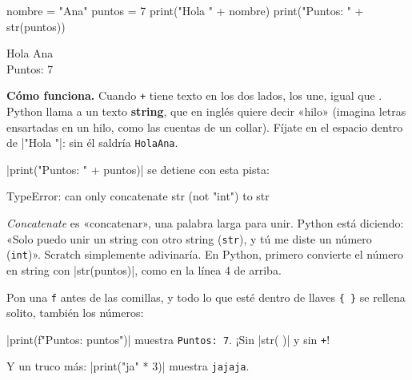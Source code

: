 \begin{tcbraster}[raster columns=1, raster valign=center, raster row skip=6pt]
\begin{tcolorbox}[colback=white, colframe=white, boxrule=0pt, valign=center]
\begin{scratch}
\end{scratch}
\end{tcolorbox}
\begin{tcolorbox}[colback=white, colframe=white, boxrule=0pt, left=0pt, right=0pt, top=0pt, bottom=0pt, valign=center]
\begin{code}
nombre = "Ana"
puntos = 7
print("Hola " + nombre)
print("Puntos: " + str(puntos))
\end{code}
\begin{outputbox}
Hola Ana\\
Puntos: 7
\end{outputbox}
\end{tcolorbox}
\end{tcbraster}

\textbf{Cómo funciona.} Cuando \texttt{+} tiene texto en los dos lados, los une, igual que . Python llama a un texto \textbf{string}, que en inglés quiere decir «hilo» (imagina letras ensartadas en un hilo, como las cuentas de un collar). Fíjate en el espacio dentro de \py|"Hola "|: sin él saldría \texttt{HolaAna}.

\begin{watchout}
\py|print("Puntos: " + puntos)| se detiene con esta pista:
\begin{errorbox}
TypeError: can only concatenate str (not "int") to str
\end{errorbox}
\emph{Concatenate} es «concatenar», una palabra larga para unir. Python está diciendo: «Solo puedo unir un string con otro string (\texttt{str}), y tú me diste un número (\texttt{int})». Scratch simplemente adivinaría. En Python, primero convierte el número en string con \py|str(puntos)|, como en la línea 4 de arriba.
\end{watchout}

\begin{think}
Pon una \texttt{f} antes de las comillas, y todo lo que esté dentro de llaves \texttt{\{ \}} se rellena solito, también los números:\par
\py|print(f"Puntos: {puntos}")| muestra \texttt{Puntos: 7}. ¡Sin \py|str( )| y sin \texttt{+}!

Y un truco más: \py|print("ja" * 3)| muestra \texttt{jajaja}.
\end{think}

